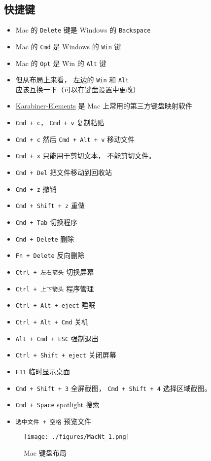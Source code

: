 
\begin{issues}
\issueDraft
\end{issues}

\subsection{快捷键}
\begin{itemize}
\item Mac 的 \verb|Delete| 键是 Windows 的 \verb|Backspace|
\item Mac 的 \verb|Cmd| 是 Windows 的 \verb|Win| 键
\item Mac 的 \verb|Opt| 是 Win 的 \verb|Alt| 键
\item 但从布局上来看， 左边的 \verb|Win| 和 \verb|Alt| 应该互换一下（可以在键盘设置中更改）
\item \href{https://karabiner-elements.pqrs.org/}{Karabiner-Elements} 是 Mac 上常用的第三方键盘映射软件
\item \verb|Cmd + c|， \verb|Cmd + v| 复制粘贴
\item \verb|Cmd + c| 然后 \verb|Cmd + Alt + v| 移动文件
\item \verb|Cmd + x| 只能用于剪切文本， 不能剪切文件。
\item \verb|Cmd + Del| 把文件移动到回收站
\item \verb|Cmd + z| 撤销
\item \verb|Cmd + Shift + z| 重做
\item \verb|Cmd + Tab| 切换程序
\item \verb|Cmd + Delete| 删除
\item \verb|Fn + Delete| 反向删除
\item \verb|Ctrl + 左右箭头| 切换屏幕
\item \verb|Ctrl + 上下箭头| 程序管理
\item \verb|Ctrl + Alt + eject| 睡眠
\item \verb|Ctrl + Alt + Cmd| 关机
\item \verb|Alt + Cmd + ESC| 强制退出
\item \verb|Ctrl + Shift + eject| 关闭屏幕
\item \verb|F11| 临时显示桌面
\item \verb|Cmd + Shift + 3| 全屏截图， \verb|Cmd + Shift + 4| 选择区域截图。
\item \verb|Cmd + Space| spotlight 搜索
\item \verb|选中文件 + 空格| 预览文件
\end{itemize}
\begin{figure}[ht]
\centering
\texttt{[image: ./figures/MacNt\_1.png]}
\caption{Mac 键盘布局} \label{MacNt_fig1}
\end{figure}


